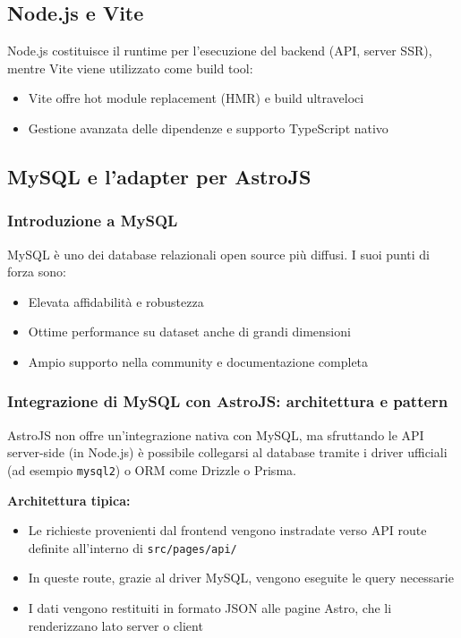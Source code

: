 \subsection{Node.js e Vite}
Node.js costituisce il runtime per l’esecuzione del backend (API, server SSR), mentre Vite viene utilizzato come build tool:
\begin{itemize}
    \item Vite offre hot module replacement (HMR) e build ultraveloci
    \item Gestione avanzata delle dipendenze e supporto TypeScript nativo
\end{itemize}

\subsection{MySQL e l’adapter per AstroJS}

\subsubsection{Introduzione a MySQL}
MySQL è uno dei database relazionali open source più diffusi. I suoi punti di forza sono:
\begin{itemize}
    \item Elevata affidabilità e robustezza
    \item Ottime performance su dataset anche di grandi dimensioni
    \item Ampio supporto nella community e documentazione completa
\end{itemize}

\subsubsection{Integrazione di MySQL con AstroJS: architettura e pattern}
AstroJS non offre un’integrazione nativa con MySQL, ma sfruttando le API server-side (in Node.js) è possibile collegarsi al database tramite i driver ufficiali (ad esempio \texttt{mysql2}) o ORM come Drizzle o Prisma.

\textbf{Architettura tipica:}
\begin{itemize}
    \item Le richieste provenienti dal frontend vengono instradate verso API route definite all’interno di \texttt{src/pages/api/}
    \item In queste route, grazie al driver MySQL, vengono eseguite le query necessarie
    \item I dati vengono restituiti in formato JSON alle pagine Astro, che li renderizzano lato server o client
\end{itemize}

